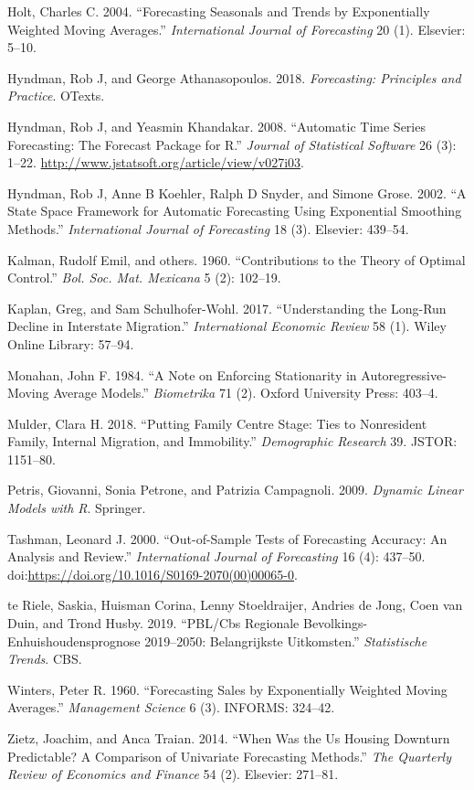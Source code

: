 \documentclass[]{article}
\begin{document}
\hypertarget{ref-holt2004forecasting}{}
Holt, Charles C. 2004. ``Forecasting Seasonals and Trends by
Exponentially Weighted Moving Averages.'' \emph{International Journal of
Forecasting} 20 (1). Elsevier: 5--10.

\hypertarget{ref-hyndman2018forecasting}{}
Hyndman, Rob J, and George Athanasopoulos. 2018. \emph{Forecasting:
Principles and Practice}. OTexts.

\hypertarget{ref-hyndman2019}{}
Hyndman, Rob J, and Yeasmin Khandakar. 2008. ``Automatic Time Series
Forecasting: The Forecast Package for R.'' \emph{Journal of Statistical
Software} 26 (3): 1--22.
\url{http://www.jstatsoft.org/article/view/v027i03}.

\hypertarget{ref-hyndman2002state}{}
Hyndman, Rob J, Anne B Koehler, Ralph D Snyder, and Simone Grose. 2002.
``A State Space Framework for Automatic Forecasting Using Exponential
Smoothing Methods.'' \emph{International Journal of Forecasting} 18 (3).
Elsevier: 439--54.

\hypertarget{ref-kalman1960contributions}{}
Kalman, Rudolf Emil, and others. 1960. ``Contributions to the Theory of
Optimal Control.'' \emph{Bol. Soc. Mat. Mexicana} 5 (2): 102--19.

\hypertarget{ref-kaplan2017understanding}{}
Kaplan, Greg, and Sam Schulhofer-Wohl. 2017. ``Understanding the
Long-Run Decline in Interstate Migration.'' \emph{International Economic
Review} 58 (1). Wiley Online Library: 57--94.

\hypertarget{ref-monahan1984note}{}
Monahan, John F. 1984. ``A Note on Enforcing Stationarity in
Autoregressive-Moving Average Models.'' \emph{Biometrika} 71 (2). Oxford
University Press: 403--4.

\hypertarget{ref-mulder2018putting}{}
Mulder, Clara H. 2018. ``Putting Family Centre Stage: Ties to
Nonresident Family, Internal Migration, and Immobility.''
\emph{Demographic Research} 39. JSTOR: 1151--80.

\hypertarget{ref-petris2009dynamic}{}
Petris, Giovanni, Sonia Petrone, and Patrizia Campagnoli. 2009.
\emph{Dynamic Linear Models with R}. Springer.

\hypertarget{ref-tashman2000out}{}
Tashman, Leonard J. 2000. ``Out-of-Sample Tests of Forecasting Accuracy:
An Analysis and Review.'' \emph{International Journal of Forecasting} 16
(4): 437--50.
doi:\href{https://doi.org/https://doi.org/10.1016/S0169-2070(00)00065-0}{https://doi.org/10.1016/S0169-2070(00)00065-0}.

\hypertarget{ref-teriele2019}{}
te Riele, Saskia, Huisman Corina, Lenny Stoeldraijer, Andries de Jong,
Coen van Duin, and Trond Husby. 2019. ``PBL/Cbs Regionale Bevolkings-
Enhuishoudensprognose 2019--2050: Belangrijkste Uitkomsten.''
\emph{Statistische Trends}. CBS.

\hypertarget{ref-winters1960forecasting}{}
Winters, Peter R. 1960. ``Forecasting Sales by Exponentially Weighted
Moving Averages.'' \emph{Management Science} 6 (3). INFORMS: 324--42.

\hypertarget{ref-zietz2014us}{}
Zietz, Joachim, and Anca Traian. 2014. ``When Was the Us Housing
Downturn Predictable? A Comparison of Univariate Forecasting Methods.''
\emph{The Quarterly Review of Economics and Finance} 54 (2). Elsevier:
271--81.
\end{document}
